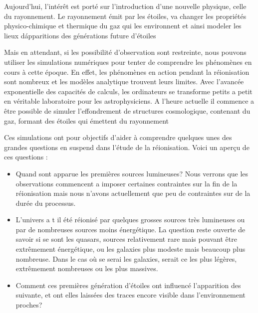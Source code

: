 Aujourd'hui, l'intérêt est porté sur l'introduction d'une nouvelle physique, celle du rayonnement.
Le rayonnement émit par les étoiles, va changer les propriétés physico-chimique et thermique du gaz qui les environnent et ainsi modeler les lieux d\'apparitions des générations future d'étoiles

Mais en attendant, si les possibilité d'observation sont restreinte, nous pouvons utiliser les simulations numériques pour tenter de comprendre les phénomènes en cours à cette époque.
En effet, les phénomènes en action pendant la réionisation sont nombreux et les modèles analytique trouvent leurs limites.
Avec l'avancée exponentielle des capacités de calculs, les ordinateurs se transforme petits a petit en véritable laboratoire pour les astrophysiciens.
A l'heure actuelle il commence a être possible de simuler l'effondrement de structures cosmologique, contenant du gaz, formant des étoiles qui émettent du rayonnement 

Ces simulations ont pour objectifs d'aider à comprendre quelques unes des grandes questions en suspend dans l'étude de la réionisation.
Voici un aperçu de ces questions : 

\begin{itemize}
\item Quand sont apparue les premières sources lumineuses?
Nous verrons que les observations commencent a imposer certaines contraintes sur la fin de la réionisation mais  nous n'avons actuellement que peu de contraintes sur de la durée du processus.

\item L'univers a t il été réionisé par quelques grosses sources très lumineuses ou par de nombreuses sources moins énergétique.
La question reste ouverte de savoir si se sont les quasars, sources relativement rare mais pouvant être extrêmement énergétique, ou les galaxies plus modeste mais beaucoup plus nombreuse.
Dans le cas où se serai les galaxies, serait ce les plus légères, extrêmement nombreuses ou les plus massives.

\item Comment ces premières génération d'étoiles ont influencé l'apparition des suivante, et ont elles laissées des traces encore visible dans l'environnement proches?

\end{itemize} 

